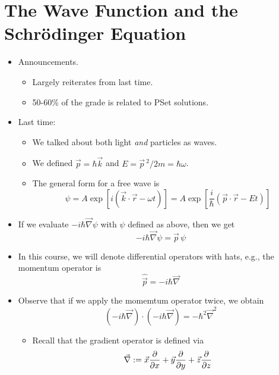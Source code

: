 \documentclass[../notes.tex]{subfiles}
\begin{document}
\section{The Wave Function and the Schr\"{o}dinger Equation}
\begin{itemize}
    \item {}Announcements.
    \begin{itemize}
        \item Largely reiterates from last time.
        \item 50-60\% of the grade is related to PSet solutions.
    \end{itemize}
    \item Last time:
    \begin{itemize}
        \item We talked about both light \emph{and} particles as waves.
        \item We defined $\vec{p}=\hbar\vec{k}$ and $E=\vec{p}{\,}^2/2m=\hbar\omega$.
        \item The general form for a free wave is
        \begin{equation*}
            \psi = A\exp[i(\vec{k}\cdot\vec{r}-\omega t)]
            = A\exp[\frac{i}{\hbar}(\vec{p}\cdot\vec{r}-Et)]
        \end{equation*}
    \end{itemize}
    \item If we evaluate $-i\hbar\vec{\nabla}\psi$ with $\psi$ defined as above, then we get
    \begin{equation*}
        -i\hbar\vec{\nabla}\psi = \vec{p}\,\psi
    \end{equation*}
    \item In this course, we will denote differential operators with hats, e.g., the momentum operator is
    \begin{equation*}
        \hat{\vec{p}} = -i\hbar\vec{\nabla}
    \end{equation*}
    \item Observe that if we apply the momemtum operator twice, we obtain
    \begin{equation*}
        (-i\hbar\vec{\nabla})\cdot(-i\hbar\vec{\nabla})=-\hbar^2\vec{\nabla}^2
    \end{equation*}
    \begin{itemize}
        \item Recall that the gradient operator is defined via
        \begin{equation*}
            \vec{\nabla} := \vec{x}\pdv{x}+\vec{y}\pdv{y}+\vec{z}\pdv{z}

\end{equation*}
\end{itemize}
\end{itemize}
\end{document}

